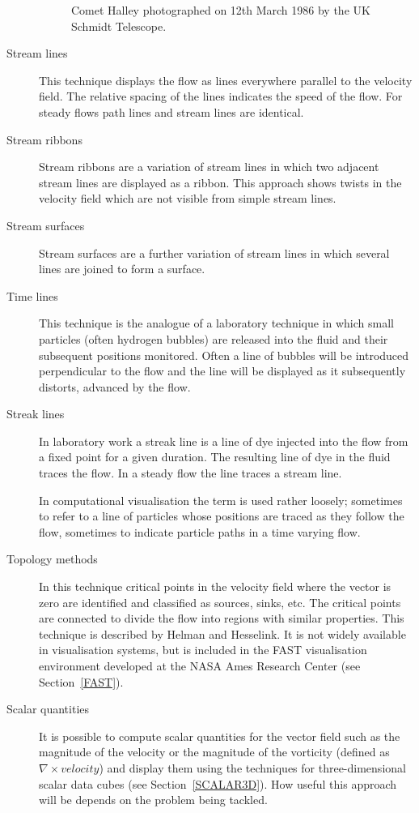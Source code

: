 \documentclass[twoside,11pt]{article}
\begin{document}
\begin{description}
\begin{figure}[htbp]
  \caption[Comet Halley.]{Comet Halley photographed on 12th March 1986
   by the UK Schmidt Telescope. \label{HALLEY} }

  \end{figure}

  \item[Stream lines] This technique displays the flow as lines
   everywhere parallel to the velocity field. The relative spacing
   of the lines indicates the speed of the flow. For steady flows
   path lines and stream lines are identical.

  \item[Stream ribbons] Stream ribbons are a variation of stream lines
   in which two adjacent stream lines are displayed as a ribbon. This
   approach shows twists in the velocity field which are not visible
   from simple stream lines.

  \item[Stream surfaces] Stream surfaces are a further variation of
   stream lines in which several lines are joined to form a surface.

  \item[Time lines] This technique is the analogue of a laboratory
   technique in which small particles (often hydrogen bubbles) are
   released into the fluid and their subsequent positions monitored.
   Often a line of bubbles will be introduced perpendicular to the
   flow and the line will be displayed as it subsequently distorts,
   advanced by the flow.

  \item[Streak lines] In laboratory work a streak line is a line of
   dye injected into the flow from a fixed point for a given duration.
   The resulting line of dye in the fluid traces the flow. In a
   steady flow the line traces a stream line.

   In computational visualisation the term is used rather loosely;
   sometimes to refer to a line of particles whose positions are traced
   as they follow the flow, sometimes to indicate particle paths in a
   time varying flow.

  \item[Topology methods] In this technique critical points in the
   velocity field where the vector is zero are identified and
   classified as sources, sinks, etc. The critical points are connected
   to divide the flow into regions with similar properties. This
   technique is described by Helman and Hesselink\cite{HELMAN}. It is
   not widely available in visualisation systems, but is included in
   the FAST visualisation environment developed at the NASA Ames
   Research Center (see Section~\ref{FAST}).

  \item[Scalar quantities] It is possible to compute scalar quantities
   for the vector field such as the magnitude of the velocity or the
   magnitude of the vorticity (defined as $\nabla  \times velocity$)
   and display them using the techniques for three-dimensional scalar
   data cubes (see Section~\ref{SCALAR3D}). How useful this approach
   will be depends on the problem being tackled.

\end{description}
\end{document}
